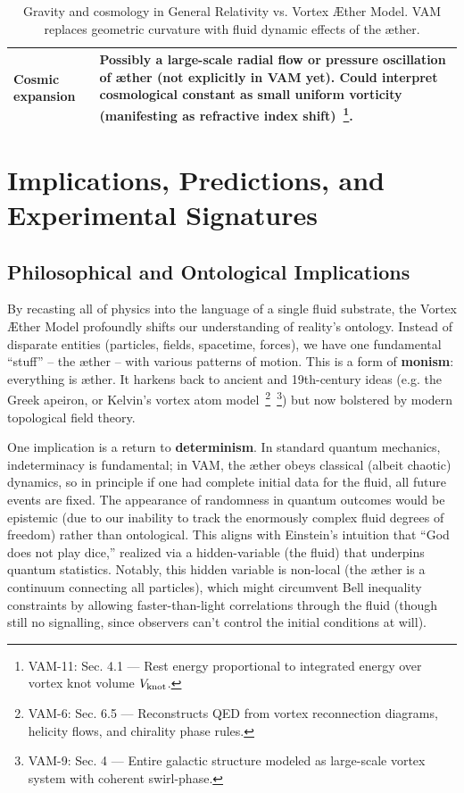 \documentclass[a4paper,12pt]{article}
\begin{document}
\begin{table}[H]
\begin{tabular}{p{} | p{}}
            Cosmic expansion & Possibly a large-scale radial flow or pressure oscillation of æther (not explicitly in VAM yet). Could interpret cosmological constant as small uniform vorticity (manifesting as refractive index shift)~\footnote{VAM-11: Sec. 4.1 — Rest energy proportional to integrated energy over vortex knot volume $V_{\rm knot}$.}. \\
            \hline
        \end{tabular}
        \caption{Gravity and cosmology in General Relativity vs. Vortex Æther Model.  VAM replaces geometric curvature with fluid dynamic effects of the æther.}
        \label{tab:GRcompare}
    \end{table}

    \newpage

\section{Implications, Predictions, and Experimental Signatures}
    \subsection{Philosophical and Ontological Implications}
    By recasting all of physics into the language of a single fluid substrate, the Vortex Æther Model profoundly shifts our understanding of reality's ontology. Instead of disparate entities (particles, fields, spacetime, forces), we have one fundamental “stuff” -- the æther -- with various patterns of motion. This is a form of \textbf{monism}: everything is æther. It harkens back to ancient and 19th-century ideas (e.g. the Greek apeiron, or Kelvin’s vortex atom model~\footnote{VAM-6: Sec. 6.5 — Reconstructs QED from vortex reconnection diagrams, helicity flows, and chirality phase rules.}~\footnote{VAM-9: Sec. 4 — Entire galactic structure modeled as large-scale vortex system with coherent swirl-phase.}) but now bolstered by modern topological field theory.

    One implication is a return to \textbf{determinism}. In standard quantum mechanics, indeterminacy is fundamental; in VAM, the æther obeys classical (albeit chaotic) dynamics, so in principle if one had complete initial data for the fluid, all future events are fixed. The appearance of randomness in quantum outcomes would be epistemic (due to our inability to track the enormously complex fluid degrees of freedom) rather than ontological. This aligns with Einstein’s intuition that “God does not play dice,” realized via a hidden-variable (the fluid) that underpins quantum statistics. Notably, this hidden variable is non-local (the æther is a continuum connecting all particles), which might circumvent Bell inequality constraints by allowing faster-than-light correlations through the fluid (though still no signalling, since observers can’t control the initial conditions at will).
\end{document}
